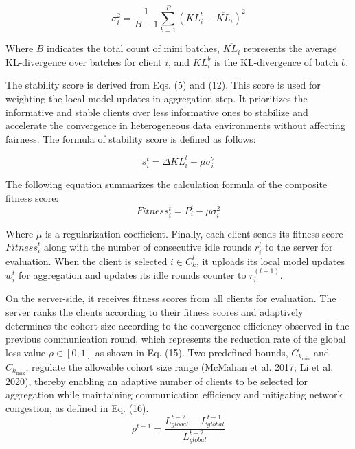\documentclass[pdflatex,sn-mathphys-num,oneside]{sn-jnl}%
\theoremstyle{thmstyleone}%
\theoremstyle{thmstyletwo}%
\theoremstyle{thmstylethree}%
\begin{document}
\begin{equation}
\sigma_i^2 = \frac{1}{B-1} \sum_{b=1}^{B} \left( KL_i^b - \overline{KL}_i \right)^2
\label{eq:variance}
\end{equation}

Where $B$ indicates the total count of mini batches, $\overline{KL_i}$ represents the average KL-divergence over batches for client $i$, and $KL_i^b$ is the KL-divergence of batch $b$.

The stability score is derived from Eqs. (5) and (12). This score is used for weighting the local model updates in aggregation step. It prioritizes the informative and stable clients over less informative ones to stabilize and accelerate the convergence in heterogeneous data environments without affecting fairness. The formula of stability score is defined as follows:

\begin{equation}
s_i^t = \Delta KL_i^t - \mu \sigma_i^2
\label{eq:stability}
\end{equation}

The following equation summarizes the calculation formula of the composite fitness score: 
\begin{equation}
Fitness_i^t = P_i^t - \mu \sigma_i^2
\label{eq:fitness}
\end{equation}

Where $\mu$ is a regularization coefficient. Finally, each client sends its fitness score ${Fitness}_i^t$ along with the number of consecutive idle rounds $r_i^t$ to the server for evaluation. When the client is selected $i\in C_k^t$, it uploads its local model updates $w_i^t$  for aggregation and updates its idle rounds counter to $r_i^{(t+1)}$.

On the server-side, it receives fitness scores from all clients for evaluation. The server ranks the clients according to their fitness scores and adaptively determines the cohort size according to the convergence efficiency observed in the previous communication round, which represents the reduction rate of the global loss value $\rho \in  [0, 1]$ as shown in Eq. (15). Two predefined bounds, $C_{k_{\min}}$ and $C_{k_{\max}}$, regulate the allowable cohort size range (McMahan et al. 2017; Li et al. 2020), thereby enabling an adaptive number
of clients to be selected for aggregation while maintaining communication efficiency and mitigating network congestion, as defined in Eq. (16).
\begin{equation}
\rho^{t-1} = \frac{L_{{global}}^{t-2} - L_{{global}}^{t-1}}{L_{{global}}^{t-2}}
\label{eq:convergence}
\end{equation}
\end{document}
